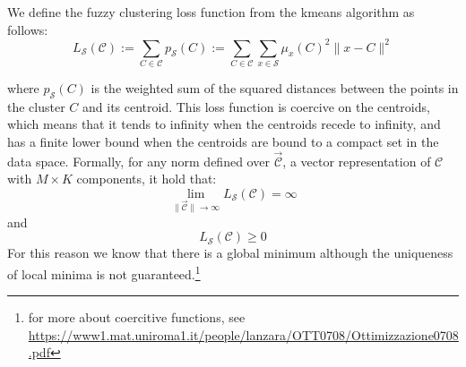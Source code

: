 \begin{definition}\label{def:fuzzyloss}
	We define the fuzzy clustering loss function from the \gls{kmeans} algorithm as follows:
	\begin{equation}
		L_\mathcal{S}(\mathcal{C}) := \sum_{C\in\mathcal{C}}p_\mathcal{S}(C) := \sum_{C\in\mathcal{C}}\sum_{x \in \mathcal{S}}\mu_x(C)^2\|x-C\|^2
		\label{eq:loss}
	\end{equation}
	\begin{modified}
	where $p_\mathcal{S}(C)$ is the weighted sum of the squared distances between the points in the cluster $C$ and its centroid. This loss function is coercive on the centroids, which means that it tends to infinity when the centroids recede to infinity, and has a finite lower bound when the centroids are bound to a compact set in the data space. Formally, for any norm defined over $\vec{\mathcal{C}}$, a vector representation of $\mathcal{C}$ with $M\times K$ components, it hold that:
	\begin{equation*}
		\lim_{\|\vec{\mathcal{C}}\|\to\infty} L_\mathcal{S}(\mathcal{C}) = \infty
	\end{equation*}
	and
	\begin{equation*}
		L_\mathcal{S}(\mathcal{C}) \geq 0
	\end{equation*}
	For this reason we know that there is a global minimum although the uniqueness of local minima is not guaranteed.\footnote{for more about coercitive functions, see \\ \url{https://www1.mat.uniroma1.it/people/lanzara/OTT0708/Ottimizzazione0708.pdf}}
	\end{modified}
\end{definition}


